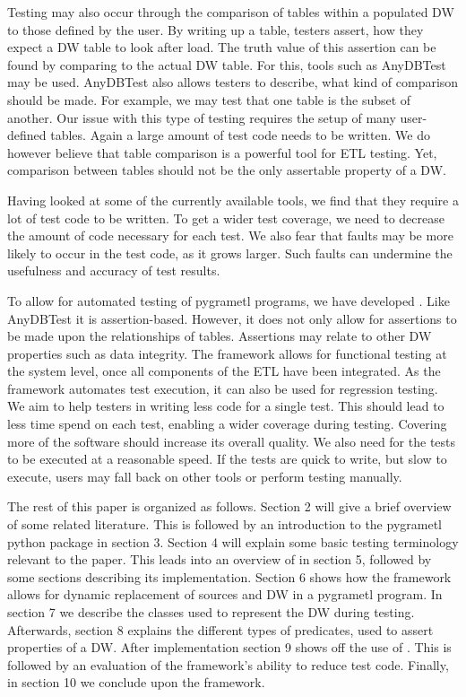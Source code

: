 Testing may also occur through the comparison of tables within a populated DW to those defined by the user. By writing up a table, testers assert, how they expect a DW table to look after load. The truth value of this assertion can be found by comparing to the actual DW table. For this, tools such as AnyDBTest\cite{AnyDbTest} may be used. AnyDBTest also allows testers to describe, what kind of comparison should be made. For example, we may test that one table is the subset of another. Our issue with this type of testing requires the setup of many user-defined tables. Again a large amount of test code needs to be written. We do however believe that table comparison is a powerful tool for ETL testing. Yet, comparison between tables should not be the only assertable property of a DW.

Having looked at some of the currently available tools, we find that they require a lot of test code to be written. To get a wider test coverage, we need to decrease the amount of code necessary for each test. We also fear that faults may be more likely to occur in the test code, as it grows larger. Such faults can undermine the usefulness and accuracy of test results.

To allow for automated testing of pygrametl programs, we have developed \FW{}. Like AnyDBTest it is assertion-based. However, it does not only allow for assertions to be made upon the relationships of tables. Assertions may relate to other DW properties such as data integrity. The framework allows for functional testing at the system level, once all components of the ETL have been integrated. As the framework automates test execution, it can also be used for regression testing. We aim to help testers in writing less code for a single test. This should lead to less time spend on each test, enabling a wider coverage during testing. Covering more of the software should increase its overall quality. We also need for the tests to be executed at a reasonable speed. If the tests are quick to write, but slow to execute, users may fall back on other tools or perform testing manually.

The rest of this paper is organized as follows. Section 2 will give a brief overview of some related literature. This is followed by an introduction to the pygrametl python package in section 3. Section 4 will explain some basic testing terminology relevant to the paper. This leads into an overview of \FW{} in section 5, followed by some sections describing its implementation. Section 6 shows how the framework allows for dynamic replacement of sources and DW in a pygrametl program.  In section 7 we describe the classes used to represent the DW during testing. Afterwards, section 8 explains the different types of predicates, used to assert properties of a DW. After implementation section 9 shows off the use of \FW{}. This is followed by an evaluation of the framework's ability to reduce test code. Finally, in section 10 we conclude upon the framework.


